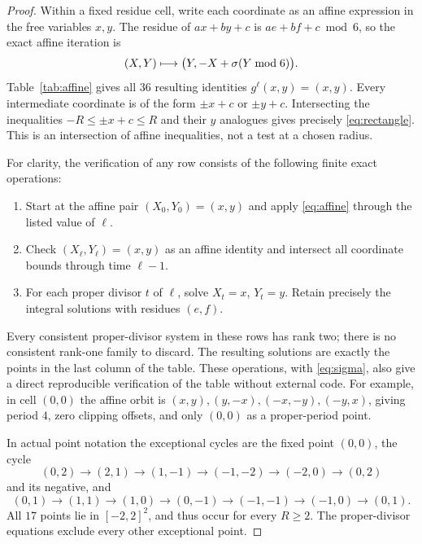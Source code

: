 \begin{proof}
Within a fixed residue cell, write each coordinate as an affine
expression in the free variables $x,y$. The residue of $ax+by+c$ is
$ae+bf+c\bmod6$, so the exact affine iteration is
\begin{equation}\label{eq:affine}
 (X,Y)\longmapsto\bigl(Y,-X+\sigma(Y\bmod6)\bigr).
\end{equation}
Table~\ref{tab:affine} gives all $36$ resulting identities
$g^\ell(x,y)=(x,y)$. Every intermediate coordinate is of the form
$\pm x+c$ or $\pm y+c$. Intersecting the inequalities
$-R\le\pm x+c\le R$ and their $y$ analogues gives precisely
\eqref{eq:rectangle}. This is an intersection of affine inequalities,
not a test at a chosen radius.

For clarity, the verification of any row consists of the following
finite exact operations:
\begin{enumerate}[label=(\roman*)]
 \item Start at the affine pair $(X_0,Y_0)=(x,y)$ and apply
       \eqref{eq:affine} through the listed value of $\ell$.
 \item Check $(X_\ell,Y_\ell)=(x,y)$ as an affine identity and
       intersect all coordinate bounds through time $\ell-1$.
 \item For each proper divisor $t$ of $\ell$, solve
       $X_t=x$, $Y_t=y$. Retain precisely the integral solutions
       with residues $(e,f)$.
\end{enumerate}
Every consistent proper-divisor system in these rows has rank two;
there is no consistent rank-one family to discard. The resulting
solutions are exactly the points in the last column of the table.
These operations, with \eqref{eq:sigma}, also give a direct
reproducible verification of the table without external code.
For example, in cell $(0,0)$ the affine orbit is
$(x,y),(y,-x),(-x,-y),(-y,x)$, giving period $4$, zero clipping
offsets, and only $(0,0)$ as a proper-period point.

In actual point notation the exceptional cycles are the fixed point
$(0,0)$, the cycle
\begin{equation}\label{eq:five-cycle}
 (0,2)\to(2,1)\to(1,-1)\to(-1,-2)\to(-2,0)\to(0,2)
\end{equation}
and its negative, and
\begin{equation}\label{eq:six-cycle}
 (0,1)\to(1,1)\to(1,0)\to(0,-1)\to(-1,-1)\to(-1,0)\to(0,1).
\end{equation}
All $17$ points lie in $[-2,2]^2$, and thus occur for every $R\ge2$.
The proper-divisor equations exclude every other exceptional point.
\end{proof}


